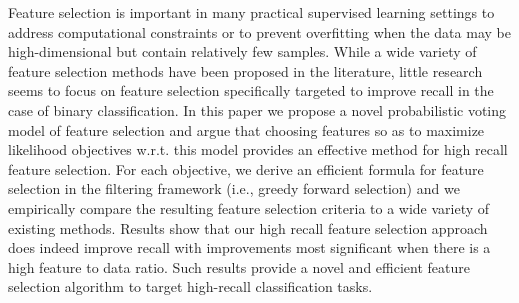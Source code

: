 Feature selection is important in many practical supervised learning
settings to address computational constraints or to prevent
overfitting when the data may be high-dimensional but contain
relatively few samples.  While a wide variety of feature selection
methods have been proposed in the literature, little research seems to
focus on feature selection specifically targeted to improve recall in
the case of binary classification.  In this paper we propose a novel
probabilistic voting model of feature selection and argue that
choosing features so as to maximize likelihood objectives w.r.t. this
model provides an effective method for high recall feature selection.
For each objective, we derive an efficient formula for feature
selection in the filtering framework (i.e., greedy forward selection)
and we empirically compare the resulting feature selection criteria to
a wide variety of existing methods.  Results show that our high recall
feature selection approach does indeed improve recall with
improvements most significant when there is a high feature to data ratio.
Such results provide a novel and efficient feature selection algorithm
to target high-recall classification tasks.



